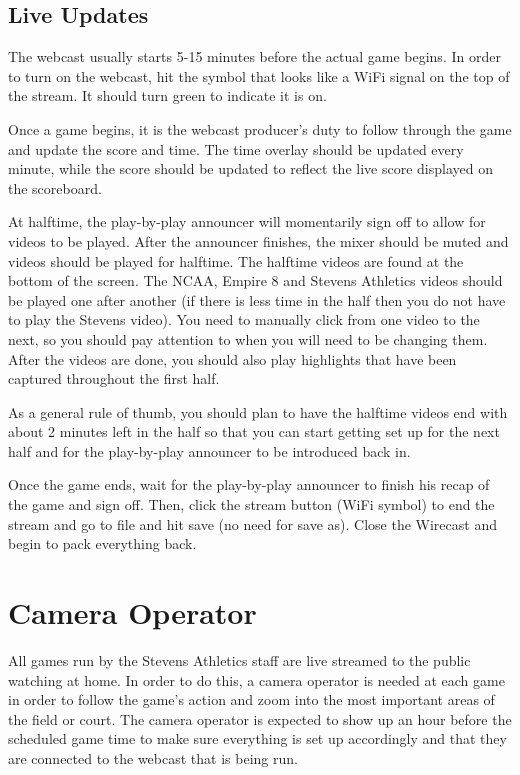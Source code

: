 \documentclass{article}
\begin{document}

\subsection{Live Updates}
The webcast usually starts 5-15 minutes before the actual game begins. In order to turn on the webcast, hit the symbol that looks like a WiFi signal on the top of the stream. It should turn green to indicate it is on. 


Once a game begins, it is the webcast producer’s duty to follow through the game and update the score and time. The time overlay should be updated every minute, while the score should be updated to reflect the live score displayed on the scoreboard. 
\newline

At halftime, the play-by-play announcer will momentarily sign off to allow for videos to be played. After the announcer finishes, the mixer should be muted and videos should be played for halftime. The halftime videos are found at the bottom of the screen. The NCAA, Empire 8 and Stevens Athletics videos should be played one after another (if there is less time in the half then you do not have to play the Stevens video). You need to manually click from one video to the next, so you should pay attention to when you will need to be changing them. After the videos are done, you should also play highlights that have been captured throughout the first half. 
\newline

As a general rule of thumb, you should plan to have the halftime videos end with about 2 minutes left in the half so that you can start getting set up for the next half and for the play-by-play announcer to be introduced back in.
\newline

Once the game ends, wait for the play-by-play announcer to finish his recap of the game and sign off. Then, click the stream button (WiFi symbol) to end the stream and go to file and hit save (no need for save as). Close the Wirecast and begin to pack everything back. 


\section{Camera Operator}
All games run by the Stevens Athletics staff are live streamed to the public watching at home. In order to do this, a camera operator is needed at each game in order to follow the game’s action and zoom into the most important areas of the field or court. The camera operator is expected to show up an hour before the scheduled game time to make sure everything is set up accordingly and that they are connected to the webcast that is being run. 
\newline 
\end{document}
